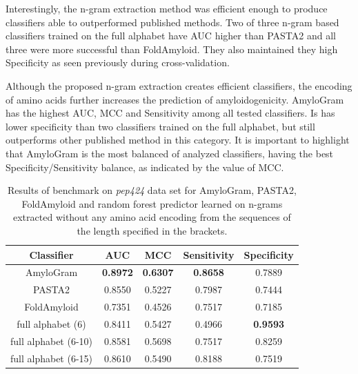 \documentclass{bioinfo}
\begin{document}
  Interestingly, the n-gram extraction method was efficient enough to produce 
classifiers able to outperformed published methods. Two of three n-gram based 
classifiers trained on the full alphabet have AUC higher than PASTA2 and all 
three were more successful than FoldAmyloid. They also maintained they high 
Specificity as seen previously during cross-validation.
    
  Although the proposed n-gram extraction creates efficient classifiers, the 
encoding of amino acids further increases the prediction of amyloidogenicity. 
AmyloGram has the highest AUC, MCC and Sensitivity among all tested classifiers. 
Is has lower specificity than two classifiers trained on the full alphabet, but 
still outperforms other published method in this category. It is important to 
highlight that AmyloGram is the most balanced of analyzed classifiers, having 
the best Specificity/Sensitivity balance, as indicated by the value of MCC.

\begin{table}[ht]
\centering
\caption{Results of benchmark on \textit{pep424} data set for AmyloGram, 
PASTA2, FoldAmyloid and random forest predictor learned on n-grams extracted 
without any amino acid encoding from the sequences of the length specified in 
the brackets.} 
\label{tab:bench_summary}
\begin{tabular}{ccccc}
  \toprule
Classifier & AUC & MCC & Sensitivity & Specificity \\ 
  \midrule
AmyloGram & \textbf{0.8972} & \textbf{0.6307} & \textbf{0.8658} & 0.7889 \\ 
   \rowcolor[gray]{0.85}PASTA2 & 0.8550 & 0.5227 & 0.7987 & 0.7444 \\ 
  FoldAmyloid & 0.7351 & 0.4526 & 0.7517 & 0.7185 \\ 
   \rowcolor[gray]{0.85}full alphabet (6) & 0.8411 & 0.5427 & 0.4966 & 
\textbf{0.9593} \\ 
  full alphabet (6-10) & 0.8581 & 0.5698 & 0.7517 & 0.8259 \\ 
   \rowcolor[gray]{0.85}full alphabet (6-15) & 0.8610 & 0.5490 & 0.8188 & 0.7519 
\\ 
   \bottomrule
\end{tabular}
\end{table}
\end{document}
